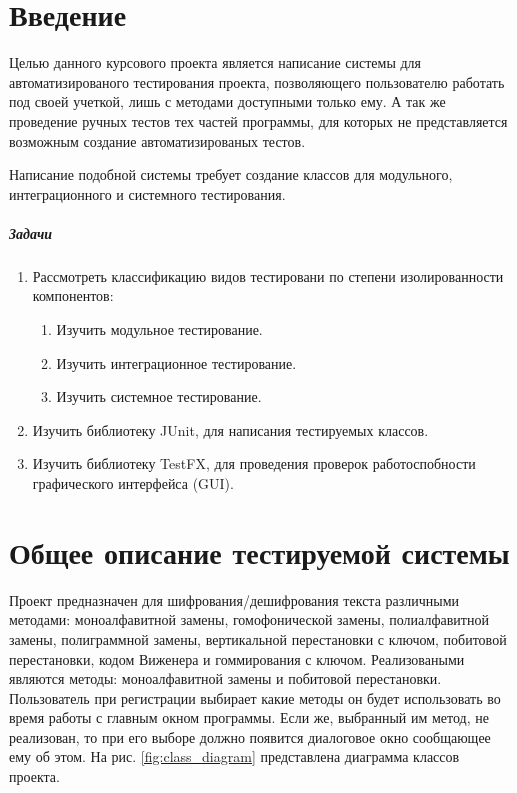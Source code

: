 \documentclass[a4paper,12pt]{article}
\begin{document}
\newpage\section*{Введение}
Целью данного курсового проекта является  написание системы для автоматизированого тестирования проекта, позволяющего пользователю работать под своей учеткой, лишь с методами доступными только ему. А так же проведение ручных тестов тех частей программы, для которых не представляется возможным создание автоматизированых тестов.
\par Написание подобной системы требует создание классов для модульного, интеграционного и системного тестирования.
\subparagraph{Задачи}
\begin{enumerate}
\item Рассмотреть классификацию видов тестировани по степени изолированности компонентов:
\begin{enumerate}
\item Изучить модульное тестирование.
\item Изучить интеграционное тестирование.
\item Изучить системное тестирование.
\end{enumerate}
\item Изучить библиотеку JUnit, для написания тестируемых классов.
\item Изучить библиотеку TestFX, для проведения проверок работоспобности графического интерфейса (GUI).
\end{enumerate}

\newpage\section{Общее описание тестируемой системы}

Проект предназначен для шифрования/дешифрования текста различными методами: моноалфавитной замены, гомофонической замены, полиалфавитной замены, полиграммной замены, вертикальной перестановки с ключом,  побитовой перестановки, кодом Виженера и гоммирования с ключом. Реализоваными являются методы: моноалфавитной замены и побитовой перестановки.
Пользователь при регистрации выбирает какие методы он будет использовать во время работы с главным окном программы. Если же, выбранный им метод, не реализован, то при его выборе должно появится диалоговое окно сообщающее ему об этом.
На рис. \ref{fig:class_diagram} представлена  диаграмма классов проекта.
\end{document}
